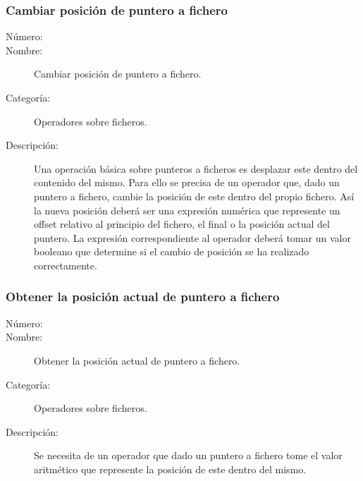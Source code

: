 \subsubsection{Cambiar posición de puntero a fichero}
\begin{framed}
	\begin{description}
		\item [Número:] \cn
		\item [Nombre:] Cambiar posición de puntero a fichero.
		\item [Categoría:] Operadores sobre ficheros.
		\item [Descripción:] Una operación básica sobre punteros a ficheros es desplazar este dentro del contenido del mismo. 
		Para ello se precisa de un operador que, dado un puntero a fichero, cambie la posición de este dentro del propio fichero.
		Así la nueva posición deberá ser una expresión numérica que represente un offset relativo al principio del fichero, el final 
		o la posición actual del puntero. La expresión correspondiente al operador deberá tomar un valor booleano que determine si el cambio
		de posición se ha realizado correctamente.
	\end{description}
\end{framed}

\subsubsection{Obtener la posición actual de puntero a fichero}
\begin{framed}
	\begin{description}
		\item [Número:] \cn
		\item [Nombre:] Obtener la posición actual de puntero a fichero.
		\item [Categoría:] Operadores sobre ficheros.
		\item [Descripción:] Se necesita de un operador que dado un puntero a fichero tome el valor aritmético que represente la posición de este 
		dentro del mismo.
	\end{description}
\end{framed}

